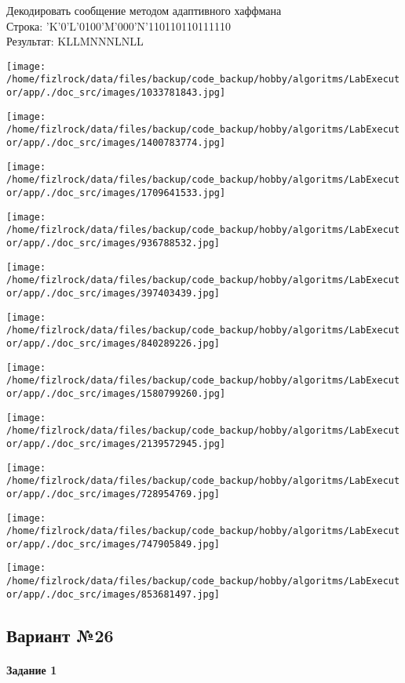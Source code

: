 \documentclass[a4paper, 12pt]{article}
\begin{document}
Декодировать сообщение методом адаптивного хаффмана \\
Строка: 
'K'0'L'0100'M'000'N'110110110111110\\
Результат: KLLMNNNLNLL

\texttt{[image: /home/fizlrock/data/files/backup/code\_backup/hobby/algoritms/LabExecutor/app/./doc\_src/images/1033781843.jpg]}

\texttt{[image: /home/fizlrock/data/files/backup/code\_backup/hobby/algoritms/LabExecutor/app/./doc\_src/images/1400783774.jpg]}

\texttt{[image: /home/fizlrock/data/files/backup/code\_backup/hobby/algoritms/LabExecutor/app/./doc\_src/images/1709641533.jpg]}

\texttt{[image: /home/fizlrock/data/files/backup/code\_backup/hobby/algoritms/LabExecutor/app/./doc\_src/images/936788532.jpg]}

\texttt{[image: /home/fizlrock/data/files/backup/code\_backup/hobby/algoritms/LabExecutor/app/./doc\_src/images/397403439.jpg]}

\texttt{[image: /home/fizlrock/data/files/backup/code\_backup/hobby/algoritms/LabExecutor/app/./doc\_src/images/840289226.jpg]}

\texttt{[image: /home/fizlrock/data/files/backup/code\_backup/hobby/algoritms/LabExecutor/app/./doc\_src/images/1580799260.jpg]}

\texttt{[image: /home/fizlrock/data/files/backup/code\_backup/hobby/algoritms/LabExecutor/app/./doc\_src/images/2139572945.jpg]}

\texttt{[image: /home/fizlrock/data/files/backup/code\_backup/hobby/algoritms/LabExecutor/app/./doc\_src/images/728954769.jpg]}

\texttt{[image: /home/fizlrock/data/files/backup/code\_backup/hobby/algoritms/LabExecutor/app/./doc\_src/images/747905849.jpg]}

\texttt{[image: /home/fizlrock/data/files/backup/code\_backup/hobby/algoritms/LabExecutor/app/./doc\_src/images/853681497.jpg]}
\pagebreak
\subsection{Вариант №26}
\paragraph{Задание 1}
\end{document}
